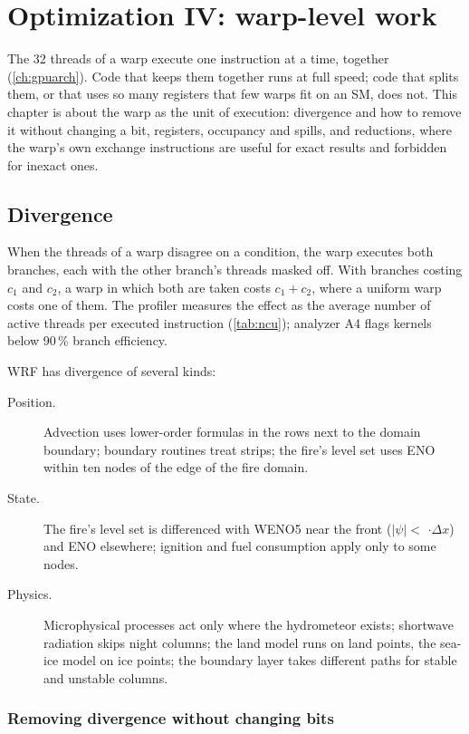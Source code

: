 \chapter{Optimization IV: warp-level work}\label{ch:warp}

The 32 threads of a warp execute one instruction at a time, together (\cref{ch:gpuarch}). Code that keeps them
together runs at full speed; code that splits them, or that uses so many registers that few warps fit on an SM, does
not. This chapter is about the warp as the unit of execution: divergence and how to remove it without changing a bit,
registers, occupancy and spills, and reductions, where the warp's own exchange instructions are useful for exact
results and forbidden for inexact ones.

\section{Divergence}

When the threads of a warp disagree on a condition, the warp executes both branches, each with the other branch's
threads masked off. With branches costing $c_1$ and $c_2$, a warp in which both are taken costs $c_1 + c_2$, where a
uniform warp costs one of them. The profiler measures the effect as the average number of active threads per executed
instruction (\cref{tab:ncu}); analyzer A4 flags kernels below 90\,\% branch efficiency.

WRF has divergence of several kinds:
\begin{description}
  \item[Position.] Advection uses lower-order formulas in the rows next to the domain boundary; boundary routines
    treat strips; the fire's level set uses ENO within ten nodes of the edge of the fire domain.
  \item[State.] The fire's level set is differenced with WENO5 near the front ($|\psi| <$
    $\cdot\Delta x$) and ENO elsewhere; ignition and fuel consumption apply only to some nodes.
  \item[Physics.] Microphysical processes act only where the hydrometeor exists; shortwave radiation skips night
    columns; the land model runs on land points, the sea-ice model on ice points; the boundary layer takes different
    paths for stable and unstable columns.
\end{description}

\subsection{Removing divergence without changing bits}

